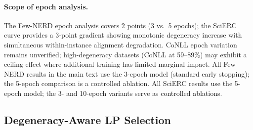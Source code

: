 \begin{table}[t]
\centering
\small
\caption{SciERC NER epoch curve (Qwen3-8B, $N{=}8$, $T{=}1.0$). Training duration modulates both instance degeneracy and within-instance LP-quality alignment. ``Degen.'': constant-F1 instance degeneracy (gold-filtered). ``LP $\Delta$'': LP selection gain over greedy (gold-filtered; none reaches the ${\approx}$1.5~pp MDE). ``$\rho$ med'': median within-instance LP-quality correlation. Greedy F1 uses span-based evaluation consistent with Tables 1--3; $\rho$ and LP $\Delta$ use text-based matching consistent with Table~\ref{tab:within_rho}.}
\label{tab:epoch_scierc}
\end{table}

\paragraph{Scope of epoch analysis.}
The Few-NERD epoch analysis covers 2 points (3 vs.\ 5 epochs); the SciERC curve provides a 3-point gradient showing monotonic degeneracy increase with simultaneous within-instance alignment degradation.
CoNLL epoch variation remains unverified; high-degeneracy datasets (CoNLL at 59--89\%) may exhibit a ceiling effect where additional training has limited marginal impact.
All Few-NERD results in the main text use the 3-epoch model (standard early stopping); the 5-epoch comparison is a controlled ablation.
All SciERC results use the 5-epoch model; the 3- and 10-epoch variants serve as controlled ablations.

\subsection{Degeneracy-Aware LP Selection}\label{app:dals}

